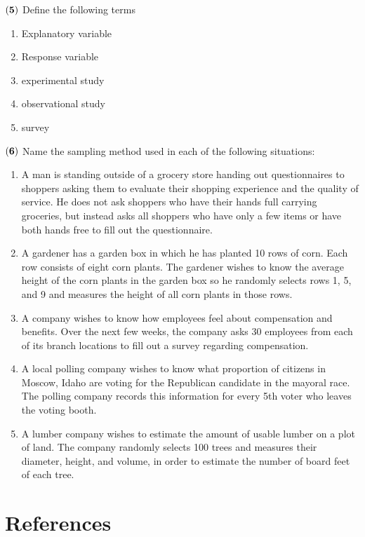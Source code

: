\documentclass[
]{article}
\begin{document}
\(\bf (5)\) Define the following terms

\begin{enumerate}
\def\labelenumi{(\alph{enumi})}
\item
  Explanatory variable
\item
  Response variable
\item
  experimental study
\item
  observational study
\item
  survey
\end{enumerate}

\(\bf (6)\) Name the sampling method used in each of the following
situations:

\begin{enumerate}
\def\labelenumi{(\alph{enumi})}
\item
  A man is standing outside of a grocery store handing out
  questionnaires to shoppers asking them to evaluate their shopping
  experience and the quality of service. He does not ask shoppers who
  have their hands full carrying groceries, but instead asks all
  shoppers who have only a few items or have both hands free to fill out
  the questionnaire.
\item
  A gardener has a garden box in which he has planted 10 rows of corn.
  Each row consists of eight corn plants. The gardener wishes to know
  the average height of the corn plants in the garden box so he randomly
  selects rows 1, 5, and 9 and measures the height of all corn plants in
  those rows.
\item
  A company wishes to know how employees feel about compensation and
  benefits. Over the next few weeks, the company asks 30 employees from
  each of its branch locations to fill out a survey regarding
  compensation.
\item
  A local polling company wishes to know what proportion of citizens in
  Moscow, Idaho are voting for the Republican candidate in the mayoral
  race. The polling company records this information for every 5th voter
  who leaves the voting booth.
\item
  A lumber company wishes to estimate the amount of usable lumber on a
  plot of land. The company randomly selects 100 trees and measures
  their diameter, height, and volume, in order to estimate the number of
  board feet of each tree.
\end{enumerate}

\newpage

\section{References}\label{references}
\end{document}
